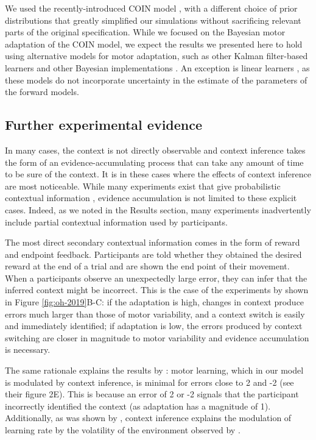 \documentclass[a4paper,doc,floatsintext,natbib]{apa6}%
\def \fref #1{Figure \ref{#1}}     %
\begin{document}
We used the recently-introduced COIN model \cite{Heald_Contextual_2021}, with a different choice of prior distributions that greatly simplified our simulations without sacrificing relevant parts of the original specification. While we focused on the Bayesian motor adaptation of the COIN model, we expect the results we presented here to hold using alternative models for motor adaptation, such as other Kalman filter-based learners \cite[e.g.][]{Oh_Minimizing_2019,Baddeley_System_2003} and other Bayesian implementations \cite[e.g.][]{Wolpert_Multiple_1998,Kording_Bayesian_2004}. An exception is linear learners \cite[e.g.][]{Smith_Interacting_2006,Forano_Timescales_2020,Lee_Dual_2009}, as these models do not incorporate uncertainty in the estimate of the parameters of the forward models.

\subsection{Further experimental evidence}
In many cases, the context is not directly observable and context inference takes the form of an evidence-accumulating process that can take any amount of time to be sure of the context. It is in these cases where the effects of context inference are most noticeable. While many experiments exist that give probabilistic contextual information \cite[e.g.][]{Scholz_uncontrolled_1999,Behrens_Learning_2007,Nassar_Dissociable_2019}, evidence accumulation is not limited to these explicit cases. Indeed, as we noted in the Results section, many experiments inadvertently include partial contextual information used by participants.

The most direct secondary contextual information comes in the form of reward and endpoint feedback. Participants are told whether they obtained the desired reward at the end of a trial and are shown the end point of their movement. When a participants observe an unexpectedly large error, they can infer that the inferred context might be incorrect. This is the case of the experiments by \cite{Oh_Minimizing_2019} shown in \fref{fig:oh-2019}B-C: if the adaptation is high, changes in context produce errors much larger than those of motor variability, and a context switch is easily and immediately identified; if adaptation is low, the errors produced by context switching are closer in magnitude to motor variability and evidence accumulation is necessary.

The same rationale explains the results by \cite{Herzfeld_memory_2014}: motor learning, which in our model is modulated by context inference, is minimal for errors close to 2 and -2 (see their figure 2E). This is because an error of 2 or -2 signals that the participant incorrectly identified the context (as adaptation has a magnitude of 1). Additionally, as was shown by \cite{Heald_Contextual_2021}, context inference explains the modulation of learning rate by the volatility of the environment observed by \cite{Herzfeld_memory_2014}.
\end{document}
